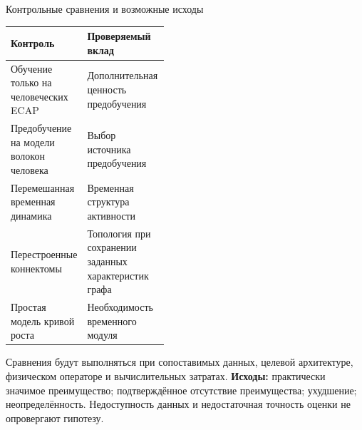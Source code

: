 \begin{frame}{Контрольные сравнения и возможные исходы}
\begin{tabularx}{\linewidth}{|L{0.44\linewidth}|Y|}
\hline Контроль & Проверяемый вклад \\\hline
Обучение только на человеческих ECAP & Дополнительная ценность предобучения \\\hline
Предобучение на модели волокон человека & Выбор источника предобучения \\\hline
Перемешанная временная динамика & Временная структура активности \\\hline
Перестроенные коннектомы & Топология при сохранении заданных характеристик графа \\\hline
Простая модель кривой роста & Необходимость временного модуля \\\hline
\end{tabularx}
\SlideGap
Сравнения будут выполняться при сопоставимых данных, целевой архитектуре, физическом операторе и вычислительных затратах.
\SlideGap
\textbf{Исходы:} практически значимое преимущество; подтверждённое отсутствие преимущества; ухудшение; неопределённость.
\SlideGap
Недоступность данных и недостаточная точность оценки не опровергают гипотезу.
\end{frame}
